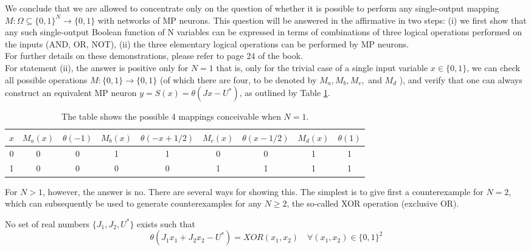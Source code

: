 \noindent
We conclude that we are allowed to concentrate only on the question of whether it is possible to perform any single-output mapping $M : \Omega \subseteq \{0, 1\}^N \rightarrow \{0, 1\}$ with networks of MP neurons. This question will be answered in the affirmative in two steps: (i) we first show that any such single-output Boolean function of N variables can be expressed in terms of combinations of three logical operations performed on the inputs (AND, OR, NOT), (ii) the three elementary logical operations can be performed by MP neurons.
\\
For further details on these demonstrations, please refer to page 24 of the book.
\\

\noindent 
For statement (ii), the answer is positive only for $N=1$ that is, only for the trivial case of a single input variable $x \in \{0, 1\}$, we can check all possible operations $M : \{0, 1\} \rightarrow \{0, 1\}$ (of which there are four, to be denoted by $M_a , M_b, M_c,$ and $M_d$ ), and verify that one can always construct an equivalent MP neuron $y = S(x) = \theta(Jx - U^* )$, as outlined by Table \ref{tab:mappings}.

\begin{table}[h!]
    \centering
    \begin{tabular}{c|cccccccc}
    $x$ & $M_a(x)$ & $\theta(-1)$ & $M_b(x)$ & $\theta(-x + 1/2)$ & $M_c(x)$ & $\theta(x - 1/2)$ & $M_d(x)$ & $\theta(1)$ \\ \hline
    0 & 0 & 0 & 1 & 1 & 0 & 0 & 1 & 1 \\
    1 & 0 & 0 & 0 & 0 & 1 & 1 & 1 & 1 \\
    \end{tabular}
    \caption{The table shows the possible 4 mappings conceivable when $N = 1$.}
    \label{tab:mappings}
\end{table}

\noindent
For $N >1$, however, the answer is no. There are several ways for showing this. The simplest is to give first a counterexample for $N = 2$, which can subsequently be used to generate counterexamples for any $N \geq 2$, the so-called XOR operation (exclusive OR).

\begin{prop}
    No set of real numbers $\{J_1 , J_2, U^* \}$ exists such that
    $$ \theta(J_1 x_1 + J_2 x_2 - U^* ) = XOR(x_1 , x_2 ) \quad \forall (x_1 , x_2 ) \in \{0, 1\}^2 $$  
\end{prop}

